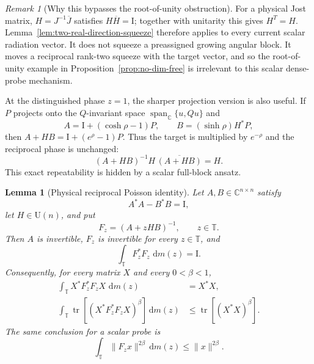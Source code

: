 \documentclass[11pt]{article}
\newtheorem{lemma}[theorem]{Lemma}
\theoremstyle{remark}
\newtheorem{remark}[theorem]{Remark}
\newcommand{\C}{\mathbb C}
\newcommand{\T}{\mathbb T}
\newcommand{\Id}{\mathrm I}
\newcommand{\dd}{\,\mathrm d}
\newcommand{\tr}{\operatorname{tr}}
\newcommand{\U}{\mathrm U}
\begin{document}
\begin{remark}[Why this bypasses the root-of-unity obstruction]
For a physical Jost matrix,
$H=J^{-1}\overline J$ satisfies $H\overline H=\Id$; together with unitarity
this gives $H^T=H$.  Lemma~\ref{lem:two-real-direction-squeeze} therefore
applies to every current scalar radiation vector.  It does not squeeze a
preassigned growing angular block.  It moves a reciprocal rank-two squeeze
with the target vector, and so the root-of-unity example in
Proposition~\ref{prop:no-dim-free} is irrelevant to this scalar dense-probe
mechanism.

At the distinguished phase $z=1$, the sharper projection version is also
useful.  If $P$ projects onto the $Q$-invariant space
$\operatorname{span}_{\C}\{u,Qu\}$ and
\[
 A=\Id+(\cosh\rho-1)P,\qquad B=(\sinh\rho)H^*P,
\]
then $A+HB=\Id+(e^\rho-1)P$.  Thus the target is multiplied by
$e^{-\rho}$ and the reciprocal phase is unchanged:
\[
 (A+HB)^{-1}H\,\overline{(A+HB)}=H.
\]
This exact repeatability is hidden by a scalar full-block ansatz.
\end{remark}

\begin{lemma}[Physical reciprocal Poisson identity]
\label{lem:physical-hardy}
Let $A,B\in\mathbb C^{n\times n}$ satisfy
\begin{equation}
 A^*A-B^*B=\Id,
 \label{eq:physical-flux-identity}
\end{equation}
let $H\in\U(n)$, and put
\[
 F_z=(A+zHB)^{-1},\qquad z\in\T.
\]
Then $A$ is invertible, $F_z$ is invertible for every $z\in\T$, and
\begin{equation}
 \int_{\T}F_z^*F_z\,\dd m(z)=\Id.
 \label{eq:physical-hardy-identity}
\end{equation}
Consequently, for every matrix $X$ and every $0<\beta<1$,
\begin{align}
 \int_{\T}X^*F_z^*F_zX\,\dd m(z)&=X^*X,
 \label{eq:physical-matrix-martingale}\\
 \int_{\T}\tr\!\left[(X^*F_z^*F_zX)^\beta\right]\dd m(z)
 &\leq\tr\!\left[(X^*X)^\beta\right].
 \label{eq:physical-fractional-nonexpansion}
\end{align}
The same conclusion for a scalar probe is
\[
 \int_{\T}\|F_zx\|^{2\beta}\dd m(z)\leq\|x\|^{2\beta}.
\]
\end{lemma}
\end{document}
